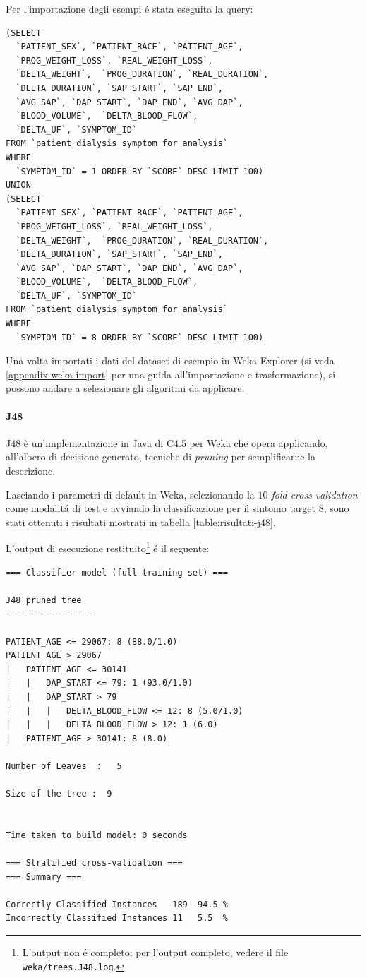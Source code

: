 \documentclass[preprint]{acm_proc_article-sp}
\begin{document}
Per l'importazione degli esempi \'e stata eseguita la query:
\begin{verbatim}
(SELECT 
  `PATIENT_SEX`, `PATIENT_RACE`, `PATIENT_AGE`,
  `PROG_WEIGHT_LOSS`, `REAL_WEIGHT_LOSS`,
  `DELTA_WEIGHT`,  `PROG_DURATION`, `REAL_DURATION`,
  `DELTA_DURATION`, `SAP_START`, `SAP_END`,
  `AVG_SAP`, `DAP_START`, `DAP_END`, `AVG_DAP`, 
  `BLOOD_VOLUME`,  `DELTA_BLOOD_FLOW`, 
  `DELTA_UF`, `SYMPTOM_ID`
FROM `patient_dialysis_symptom_for_analysis`
WHERE
  `SYMPTOM_ID` = 1 ORDER BY `SCORE` DESC LIMIT 100)
UNION
(SELECT
  `PATIENT_SEX`, `PATIENT_RACE`, `PATIENT_AGE`,
  `PROG_WEIGHT_LOSS`, `REAL_WEIGHT_LOSS`,
  `DELTA_WEIGHT`,  `PROG_DURATION`, `REAL_DURATION`,
  `DELTA_DURATION`, `SAP_START`, `SAP_END`,
  `AVG_SAP`, `DAP_START`, `DAP_END`, `AVG_DAP`, 
  `BLOOD_VOLUME`,  `DELTA_BLOOD_FLOW`, 
  `DELTA_UF`, `SYMPTOM_ID`
FROM `patient_dialysis_symptom_for_analysis`
WHERE
  `SYMPTOM_ID` = 8 ORDER BY `SCORE` DESC LIMIT 100)
\end{verbatim}

Una volta importati i dati del dataset di esempio in Weka Explorer (si veda \ref{appendix-weka-import} per una guida all'importazione e trasformazione), si possono andare a selezionare gli algoritmi da applicare.

\paragraph{J48}
J48 è un'implementazione in Java di C4.5 per Weka che opera applicando, all'albero di decisione generato, tecniche di \textit{pruning} per semplificarne la descrizione.

Lasciando i parametri di default in Weka, selezionando la $10$\textit{-fold cross-validation} come modalit\'a di test e avviando la classificazione per il sintomo target $8$, sono stati ottenuti i risultati mostrati in tabella \ref{table:risultati-j48}.

L'output di esecuzione restituito\footnote{L'output non \'e completo; per l'output completo, vedere il file \verb|weka/trees.J48.log|.} \'e il seguente:

\begin{verbatim}
=== Classifier model (full training set) ===

J48 pruned tree
------------------

PATIENT_AGE <= 29067: 8 (88.0/1.0)
PATIENT_AGE > 29067
|   PATIENT_AGE <= 30141
|   |   DAP_START <= 79: 1 (93.0/1.0)
|   |   DAP_START > 79
|   |   |   DELTA_BLOOD_FLOW <= 12: 8 (5.0/1.0)
|   |   |   DELTA_BLOOD_FLOW > 12: 1 (6.0)
|   PATIENT_AGE > 30141: 8 (8.0)

Number of Leaves  :   5

Size of the tree :  9


Time taken to build model: 0 seconds

=== Stratified cross-validation ===
=== Summary ===

Correctly Classified Instances   189  94.5 %
Incorrectly Classified Instances 11   5.5  %
\end{verbatim}
\end{document}
